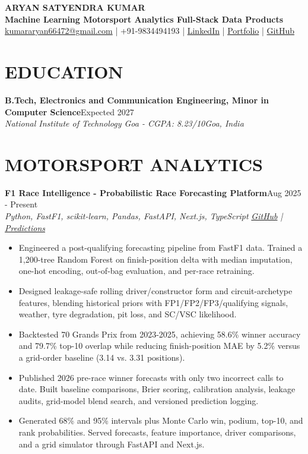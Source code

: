 \documentclass[9pt,a4paper]{extarticle}
\newcommand{\subhdr}[2]{\textbf{#1}\hfill #2}
\newcommand{\roleline}[2]{\textit{#1}\hfill \textit{#2}}
\begin{document}
\begin{center}
  {\Large\textbf{ARYAN SATYENDRA KUMAR}}\\[1.5pt]
  {\small\textbf{Machine Learning \textbar{} Motorsport Analytics \textbar{} Full-Stack Data Products}}\\[2.2pt]
  \href{mailto:kumararyan66472@gmail.com}{kumararyan66472@gmail.com}
  \;|\; +91-9834494193
  \;|\; \href{https://www.linkedin.com/in/kumaryan12}{LinkedIn}
  \;|\; \href{https://my-portfolio-ecru-ten-mpqh534zz4.vercel.app}{Portfolio}
  \;|\; \href{https://github.com/Kumaryan12}{GitHub}
\end{center}

\vspace{-2pt}

\section*{EDUCATION}
\subhdr{B.Tech, Electronics and Communication Engineering, Minor in Computer Science}{Expected 2027}\\[-0.5pt]
\roleline{National Institute of Technology Goa - CGPA: 8.23/10}{Goa, India}

\section*{MOTORSPORT ANALYTICS}
\subhdr{F1 Race Intelligence - Probabilistic Race Forecasting Platform}{Aug 2025 - Present}\\[-0.5pt]
\textit{Python, FastF1, scikit-learn, Pandas, FastAPI, Next.js, TypeScript}
\hfill
\textit{\href{https://github.com/Kumaryan12/F1_prediction_2026}{GitHub} \;|\; \href{https://instagram.com/ak_predicts}{Predictions}}

\begin{itemize}
  \item Engineered a post-qualifying forecasting pipeline from FastF1 data. Trained a 1,200-tree Random Forest on finish-position delta with median imputation, one-hot encoding, out-of-bag evaluation, and per-race retraining.
  \item Designed leakage-safe rolling driver/constructor form and circuit-archetype features, blending historical priors with FP1/FP2/FP3/qualifying signals, weather, tyre degradation, pit loss, and SC/VSC likelihood.
  \item Backtested 70 Grands Prix from 2023-2025, achieving 58.6\% winner accuracy and 79.7\% top-10 overlap while reducing finish-position MAE by 5.2\% versus a grid-order baseline (3.14 vs. 3.31 positions).
  \item Published 2026 pre-race winner forecasts with only two incorrect calls to date. Built baseline comparisons, Brier scoring, calibration analysis, leakage audits, grid-model blend search, and versioned prediction logging.
  \item Generated 68\% and 95\% intervals plus Monte Carlo win, podium, top-10, and rank probabilities. Served forecasts, feature importance, driver comparisons, and a grid simulator through FastAPI and Next.js.
\end{itemize}
\end{document}
